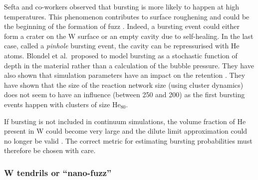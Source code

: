 Sefta and co-workers observed that \gls{bursting} is more likely to happen at high temperatures.
This phenomenon contributes to surface roughening and could be the beginning of the formation of \gls{fuzz} .
Indeed, a \gls{bursting} event could either form a crater on the W surface or an empty cavity due to self-healing.
In the last case, called a \textit{pinhole} \gls{bursting} event, the cavity can be repressurised with He atoms.
Blondel et al.\ proposed to model \gls{bursting} as a stochastic function of depth in the material rather than a calculation of the bubble pressure.
They have also shown that simulation parameters have an impact on the \gls{retention} .
They have shown that the size of the reaction network size (using cluster dynamics) does not seem to have an influence (between 250 and 200) as the first bursting events happen with clusters of size $\text{He}_{80}$.

If \gls{bursting} is not included in continuum simulations, the volume fraction of He present in W could become very large and the dilute limit approximation could no longer be valid .
The correct metric for estimating \gls{bursting} probabilities must therefore be chosen with care.

\subsubsection{W tendrils or ``nano-fuzz''}

